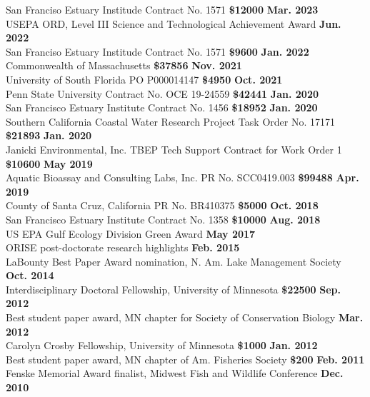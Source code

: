 \documentclass[letterpaper,12pt]{article}
\begin{document}
San Franciso Estuary Institude Contract No. 1571 {\bf \$12000} \hfill {\bf Mar. 2023} \\
USEPA ORD, Level III Science and Technological Achievement Award \hfill {\bf Jun. 2022} \\
San Franciso Estuary Institude Contract No. 1571 {\bf \$9600} \hfill {\bf Jan. 2022} \\
Commonwealth of Massachusetts {\bf \$37856} \hfill {\bf Nov. 2021} \\
University of South Florida PO P000014147 {\bf \$4950} \hfill {\bf Oct. 2021} \\
Penn State University Contract No. OCE 19-24559 {\bf \$42441} \hfill {\bf Jan. 2020} \\
San Francisco Estuary Institute Contract No. 1456 {\bf \$18952} \hfill {\bf Jan. 2020} \\
Southern California Coastal Water Research Project Task Order No. 17171 {\bf \$21893} \hfill {\bf Jan. 2020} \\
Janicki Environmental, Inc. TBEP Tech Support Contract for Work Order 1 {\bf \$10600} \hfill {\bf May 2019} \\
Aquatic Bioassay and Consulting Labs, Inc. PR No. SCC0419.003 {\bf \$99488} \hfill {\bf Apr. 2019} \\
County of Santa Cruz, California PR No. BR410375 {\bf \$5000} \hfill {\bf Oct. 2018} \\
San Francisco Estuary Institute Contract No. 1358 {\bf \$10000} \hfill {\bf Aug. 2018} \\
US EPA Gulf Ecology Division Green Award \hfill {\bf May 2017} \\
ORISE post-doctorate research highlights \hfill {\bf Feb. 2015} \\
LaBounty Best Paper Award nomination, N. Am. Lake Management Society \hfill {\bf Oct. 2014} \\
Interdisciplinary Doctoral Fellowship, University of Minnesota {\bf \$22500} \hfill {\bf Sep. 2012} \\
Best student paper award, MN chapter for Society of Conservation Biology \hfill {\bf Mar. 2012} \\
Carolyn Crosby Fellowship, University of Minnesota {\bf \$1000} \hfill {\bf Jan. 2012} \\
Best student paper award, MN chapter of Am. Fisheries Society {\bf \$200} \hfill {\bf Feb. 2011} \\
Fenske Memorial Award finalist, Midwest Fish and Wildlife Conference \hfill {\bf Dec. 2010} \\
\end{document}
